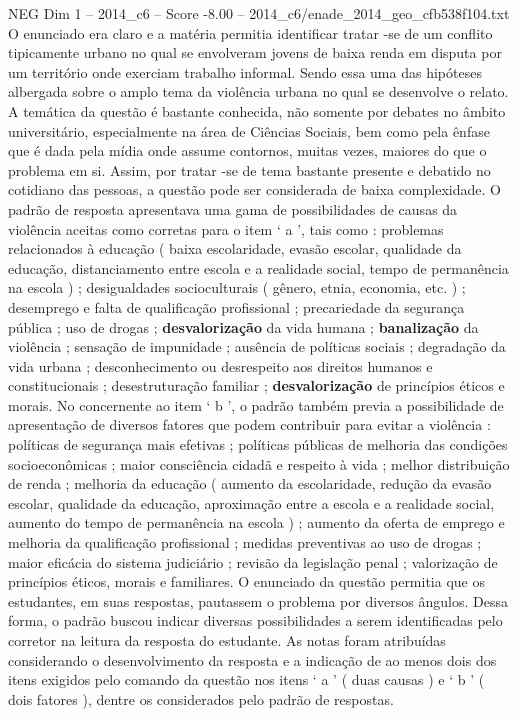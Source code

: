 \begin{textsample}{NEG Dim 1 – 2014\_c6 – Score -8.00 – 2014\_c6/enade\_2014\_geo\_cfb538f104.txt}
O enunciado era claro e a matéria permitia identificar tratar -se de um conflito tipicamente urbano no qual se envolveram jovens de baixa renda em disputa por um território onde exerciam trabalho informal.
Sendo essa uma das hipóteses albergada sobre o amplo tema da violência urbana no qual se desenvolve o relato.
A temática da questão é bastante conhecida, não somente por debates no âmbito universitário, especialmente na área de Ciências Sociais, bem como pela ênfase que é dada pela mídia onde assume contornos, muitas vezes, maiores do que o problema em si.
Assim, por tratar -se de tema bastante presente e debatido no cotidiano das pessoas, a questão pode ser considerada de baixa complexidade.
O padrão de resposta apresentava uma gama de possibilidades de causas da violência aceitas como corretas para o item ‘ a ’, tais como : problemas relacionados à educação ( baixa escolaridade, evasão escolar, qualidade da educação, distanciamento entre escola e a realidade social, tempo de permanência na escola ) ; desigualdades socioculturais ( gênero, etnia, economia, etc. ) ; desemprego e falta de qualificação profissional ; precariedade da segurança pública ; uso de drogas ; \textbf{desvalorização} da vida humana ; \textbf{banalização} da violência ; sensação de impunidade ; ausência de políticas sociais ; degradação da vida urbana ; desconhecimento ou desrespeito aos direitos humanos e constitucionais ; desestruturação familiar ; \textbf{desvalorização} de princípios éticos e morais.
No concernente ao item ‘ b ’, o padrão também previa a possibilidade de apresentação de diversos fatores que podem contribuir para evitar a violência : políticas de segurança mais efetivas ; políticas públicas de melhoria das condições socioeconômicas ; maior consciência cidadã e respeito à vida ; melhor distribuição de renda ; melhoria da educação ( aumento da escolaridade, redução da evasão escolar, qualidade da educação, aproximação entre a escola e a realidade social, aumento do tempo de permanência na escola ) ; aumento da oferta de emprego e melhoria da qualificação profissional ; medidas preventivas ao uso de drogas ; maior eficácia do sistema judiciário ; revisão da legislação penal ; valorização de princípios éticos, morais e familiares.
O enunciado da questão permitia que os estudantes, em suas respostas, pautassem o problema por diversos ângulos.
Dessa forma, o padrão buscou indicar diversas possibilidades a serem identificadas pelo corretor na leitura da resposta do estudante.
As notas foram atribuídas considerando o desenvolvimento da resposta e a indicação de ao menos dois dos itens exigidos pelo comando da questão nos itens ‘ a ’ ( duas causas ) e ‘ b ’ ( dois fatores ), dentre os considerados pelo padrão de respostas.

\end{textsample}
